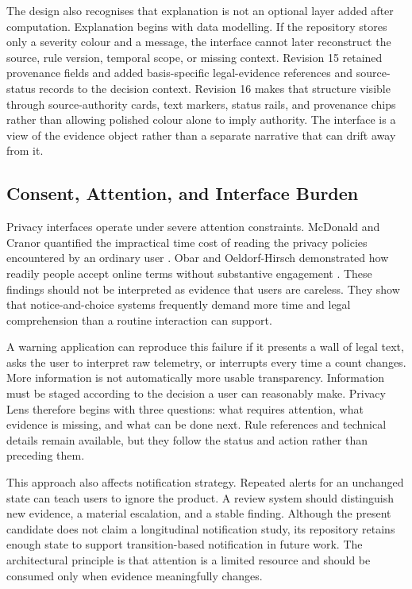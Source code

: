 The design also recognises that explanation is not an optional layer added after computation. Explanation begins with data modelling. If the repository stores only a severity colour and a message, the interface cannot later reconstruct the source, rule version, temporal scope, or missing context. Revision 15 retained provenance fields and added basis-specific legal-evidence references and source-status records to the decision context. Revision 16 makes that structure visible through source-authority cards, text markers, status rails, and provenance chips rather than allowing polished colour alone to imply authority. The interface is a view of the evidence object rather than a separate narrative that can drift away from it.

\subsection{Consent, Attention, and Interface Burden}

Privacy interfaces operate under severe attention constraints. McDonald and Cranor quantified the impractical time cost of reading the privacy policies encountered by an ordinary user \cite{12}. Obar and Oeldorf-Hirsch demonstrated how readily people accept online terms without substantive engagement \cite{13}. These findings should not be interpreted as evidence that users are careless. They show that notice-and-choice systems frequently demand more time and legal comprehension than a routine interaction can support.

A warning application can reproduce this failure if it presents a wall of legal text, asks the user to interpret raw telemetry, or interrupts every time a count changes. More information is not automatically more usable transparency. Information must be staged according to the decision a user can reasonably make. Privacy Lens therefore begins with three questions: what requires attention, what evidence is missing, and what can be done next. Rule references and technical details remain available, but they follow the status and action rather than preceding them.

This approach also affects notification strategy. Repeated alerts for an unchanged state can teach users to ignore the product. A review system should distinguish new evidence, a material escalation, and a stable finding. Although the present candidate does not claim a longitudinal notification study, its repository retains enough state to support transition-based notification in future work. The architectural principle is that attention is a limited resource and should be consumed only when evidence meaningfully changes.


